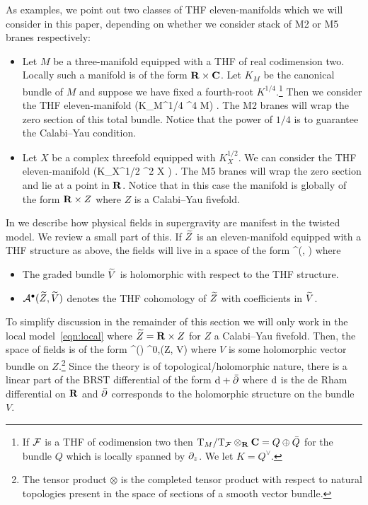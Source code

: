 \documentclass[../main.tex]{subfiles}
\begin{document}
As examples, we point out two classes of THF eleven-manifolds which we will consider in this paper, depending on whether we consider stack of M2 or M5 branes respectively:
\begin{itemize}
\item Let $M$ be a three-manifold equipped with a THF of real codimension two. 
Locally such a manifold is of the form $\mathbf{R} \times \mathbf{C}$.
Let $K_M$ be the canonical bundle of $M$ and suppose we have fixed a fourth-root $K^{1/4}$.\footnote{If $\mathcal F$ is a THF of codimension two then ${\mathrm{T}}_M / {\mathrm{T}}_\mathcal F \otimes_{\mathbf{R}} \mathbf{C} = Q \oplus \bar{Q}$ for the bundle $Q$ which is locally spanned by $\partial_z$.
We let $K = Q^\vee$.}
Then we consider the THF eleven-manifold 
\beqn\label{eqn:thfm2}
 \left(K_M^{1/4} \otimes \C^4 \to M\right) .
\eeqn
The M2 branes will wrap the zero section of this total bundle.
Notice that the power of $1/4$ is to guarantee the Calabi--Yau condition.
\item Let $X$ be a complex threefold equipped with $K_X^{1/2}$.
We can consider the THF eleven-manifold
\beqn\label{eqn:thfm5}
\R \times {} \left(K_X^{1/2} \otimes \C^2 \to X \right) .
\eeqn
The M5 branes will wrap the zero section and lie at a point in $\mathbf{R}$.
Notice that in this case the manifold is globally of the form $\mathbf{R} \times Z$ where $Z$ is a Calabi--Yau fivefold.
\end{itemize}


In \cite{RSW,RWindex} we describe how physical fields in supergravity are manifest in the twisted model.
We review a small part of this.
If $\widetilde{Z}$ is an eleven-manifold equipped with a THF structure as above, the fields will live in a space of the form
\beqn
\cA^\bu(, )
\eeqn
where
\begin{itemize}
\item The graded bundle $\widetilde{V}$ is holomorphic with respect to the THF structure.
\item $\mathcal A^\bullet (\widetilde{Z}, \widetilde{V})$ denotes the THF cohomology of $\widetilde{Z}$ with coefficients in $\widetilde{V}$.
\end{itemize}
To simplify discussion in the remainder of this section we will only work in the local model~\eqref{eqn:local} where $\widetilde{Z} = \mathbf{R} \times Z$ for $Z$ a Calabi--Yau fivefold.
Then, the space of fields is of the form
\beqn
\Omega^\bu(\R) \otimes \Omega^{0,\bu}(Z, V)
\eeqn
where $V$ is some holomorphic vector bundle on $Z$.\footnote{The tensor product $\otimes$ is the completed tensor product with respect to natural topologies present in the space of sections of a smooth vector bundle.}
Since the theory is of topological/holomorphic nature, there is a linear part of the BRST differential of the form $\mathrm{d} + \bar{\partial}$ where $\mathrm{d}$ is the de Rham differential on $\mathbf{R}$ and $\bar{\partial}$ corresponds to the holomorphic structure on the bundle $V$.
\end{document}
